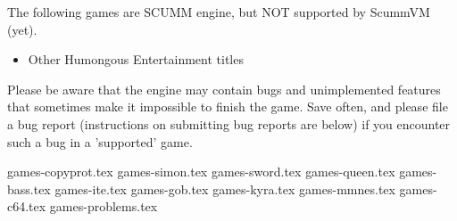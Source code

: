 \begin{itemize}
  The following games are SCUMM engine, but NOT supported by ScummVM (yet).
  \begin{itemize}
  \item Other Humongous Entertainment titles
  \end{itemize}
%
Please be aware that the engine may contain bugs and unimplemented features
that sometimes make it impossible to finish the game. Save often, and please
file a bug report (instructions on submitting bug reports are below) if you
encounter such a bug in a 'supported' game.
\end{itemize}
 {games-copyprot.tex}
 {games-simon.tex}
 {games-sword.tex}
 {games-queen.tex}
 {games-bass.tex}
 {games-ite.tex}
 {games-gob.tex}
 {games-kyra.tex}
 {games-mmnes.tex}
 {games-c64.tex}
 {games-problems.tex}

